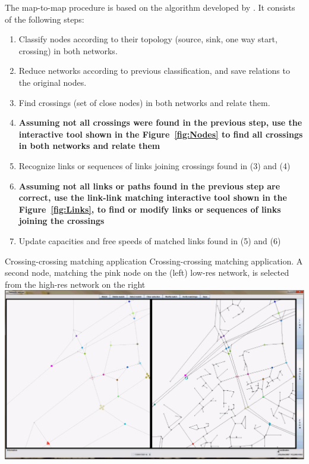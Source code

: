 The map-to-map procedure is based on the algorithm developed by \citet{BalmerEtAl_STRC_2005}. It consists of the following steps:
%
\begin{enumerate}\styleEnumerate
\item Classify nodes according to their topology (\eg source, sink, one way start, crossing) in both networks.
\item Reduce networks according to previous classification, and save relations to the original nodes.
\item Find crossings (set of close nodes) in both networks and relate them.
\item \textbf{Assuming not all crossings were found in the previous step, use the interactive tool shown in the Figure~\ref{fig:Nodes} to find all crossings in both networks and relate them}
\item Recognize links or sequences of links joining crossings found in (3) and (4)
\item \textbf{Assuming not all links or paths found in the previous step are correct, use the link-link matching interactive tool shown in the Figure~\ref{fig:Links}, to find or modify links or sequences of links joining the crossings}
\item Update capacities and free speeds of matched links found in (5) and (6)
\end{enumerate}
%
\createfigure
{Crossing-crossing matching application}
{Crossing-crossing matching application. A second node, matching the pink node on the (left) low-res network, is selected from the high-res network on the right}
{\label{fig:Nodes}}
{\includegraphics[width=1.0\textwidth]{extending/figures/netEdSing/Nodes.png}}
{}

